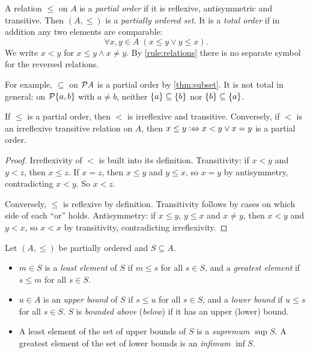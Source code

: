 \begin{definition}
\label{def:order}
A relation $\le$ on $A$ is a \emph{partial order} if it is reflexive,
antisymmetric and transitive. Then $(A, \le)$ is a \emph{partially ordered set}.
It is a \emph{total order} if in addition any two elements are comparable:
\[
  \forall x, y \in A\; (x \le y \lor y \le x).
\]
We write $x < y$ for $x \le y \land x \neq y$. By \cref{rule:relations} there is
no separate symbol for the reversed relations.
\end{definition}

For example, $\subseteq$ on $\mathcal{P} A$ is a partial order by \cref{thm:subset}. It is
not total in general: on $\mathcal{P} \lbrace a, b \rbrace$ with $a \neq b$, neither $\lbrace a \rbrace
\subseteq \lbrace b \rbrace$ nor $\lbrace b \rbrace \subseteq \lbrace a \rbrace$.

\begin{lemma}
\label{lem:strict-order}
If $\le$ is a partial order, then $<$ is irreflexive and transitive. Conversely,
if $<$ is an irreflexive transitive relation on $A$, then $x \le y \mathrel{\vcentcolon\Leftrightarrow} x < y
\lor x = y$ is a partial order.
\end{lemma}

\begin{proof}
Irreflexivity of $<$ is built into its definition. Transitivity: if $x < y$ and $y
< z$, then $x \le z$. If $x = z$, then $x \le y$ and $y \le x$, so $x = y$ by
antisymmetry, contradicting $x < y$. So $x < z$.

Conversely, $\le$ is reflexive by definition. Transitivity follows by cases on
which side of each \enquote{or} holds. Antisymmetry: if $x \le y$, $y \le x$ and
$x \neq y$, then $x < y$ and $y < x$, so $x < x$ by transitivity, contradicting
irreflexivity.
\end{proof}

\begin{definition}[Bounds]
\label{def:bounds}
Let $(A, \le)$ be partially ordered and $S \subseteq A$.
\begin{itemize}
  \item $m \in S$ is a \emph{least element} of $S$ if $m \le s$ for all $s \in S$,
    and a \emph{greatest element} if $s \le m$ for all $s \in S$.
  \item $u \in A$ is an \emph{upper bound} of $S$ if $s \le u$ for all $s \in S$,
    and a \emph{lower bound} if $u \le s$ for all $s \in S$. $S$ is \emph{bounded
    above} (\emph{below}) if it has an upper (lower) bound.
  \item A least element of the set of upper bounds of $S$ is a \emph{supremum}
    $\sup S$. A greatest element of the set of lower bounds is an \emph{infimum}
    $\inf S$.
\end{itemize}
\end{definition}

